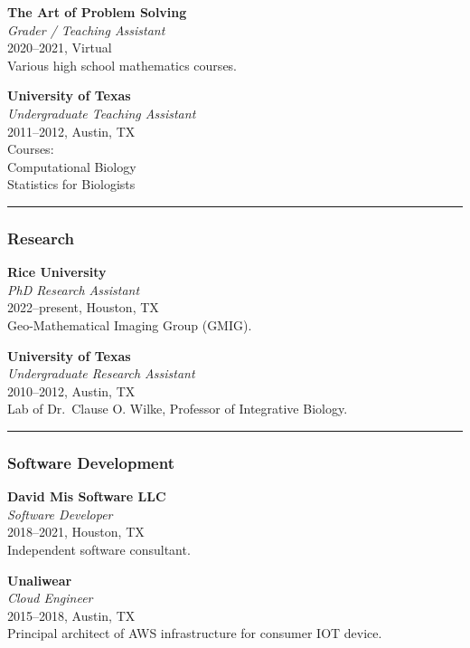 \documentclass[
  letterpaper,
  DIV=11,
  numbers=noendperiod]{scrartcl}
\begin{document}
\textbf{The Art of Problem Solving}\\
\emph{Grader / Teaching Assistant}\\
2020--2021, Virtual\\
Various high school mathematics courses.

\textbf{University of Texas}\\
\emph{Undergraduate Teaching Assistant}\\
2011--2012, Austin, TX\\
Courses:\\
{Computational Biology}\\
{Statistics for Biologists}

\begin{center}\rule{0.5\linewidth}{0.5pt}\end{center}

\subsubsection{Research}\label{research}

\textbf{Rice University}\\
\emph{PhD Research Assistant}\\
2022--present, Houston, TX\\
Geo-Mathematical Imaging Group (GMIG).

\textbf{University of Texas}\\
\emph{Undergraduate Research Assistant}\\
2010--2012, Austin, TX\\
Lab of Dr.~Clause O. Wilke, Professor of Integrative Biology.

\begin{center}\rule{0.5\linewidth}{0.5pt}\end{center}

\subsubsection{Software Development}\label{software-development}

\textbf{David Mis Software LLC}\\
\emph{Software Developer}\\
2018--2021, Houston, TX\\
Independent software consultant.

\textbf{Unaliwear}\\
\emph{Cloud Engineer}\\
2015--2018, Austin, TX\\
Principal architect of AWS infrastructure for consumer IOT device.
\end{document}
